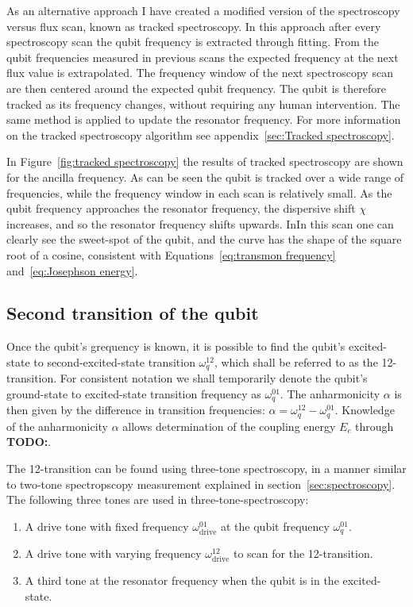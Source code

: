         As an alternative approach I have created a modified version of the spectroscopy versus flux scan, known as tracked spectroscopy. In this approach after every spectroscopy scan the qubit frequency is extracted through fitting. From the qubit frequencies measured in previous scans the expected frequency at the next flux value is extrapolated. The frequency window of the next spectroscopy scan are then centered around the expected qubit frequency. The qubit is therefore tracked as its frequency changes, without requiring any human intervention. The same method is applied to update the resonator frequency. For more information on the tracked spectroscopy algorithm see appendix~\ref{sec:Tracked spectroscopy}.

        In Figure~\ref{fig:tracked spectroscopy} the results of tracked spectroscopy are shown for the ancilla frequency. As can be seen the qubit is tracked over a wide range of frequencies, while the frequency window in each scan is relatively small. As the qubit frequency approaches the resonator frequency, the dispersive shift $\chi$ increases, and so the resonator frequency shifts upwards. InIn this scan one can clearly see the sweet-spot of the qubit, and the curve has the shape of the square root of a cosine, consistent with Equations~\ref{eq:transmon frequency} and~\ref{eq:Josephson energy}.

      \subsection{Second transition of the qubit}
        \label{ssec:12-transition spectroscopy}
        Once the qubit's grequency is known, it is possible to find the qubit's excited-state to second-excited-state transition $\omega_q^{12}$, which shall be referred to as the 12-transition. For consistent notation we shall temporarily denote the qubit's ground-state to excited-state transition frequency as $\omega_q^{01}$. The anharmonicity $\alpha$ is then given by the difference in transition frequencies: $\alpha = \omega_q^{12} - \omega_q^{01}$. Knowledge of the anharmonicity $\alpha$ allows determination of the coupling energy $E_c$ through \textbf{TODO:}.

        The 12-transition can be found using three-tone spectroscopy, in a manner similar to two-tone spectropscopy measurement explained in section~\ref{sec:spectroscopy}. The following three tones are used in three-tone-spectroscopy:

        \begin{enumerate}
          \item A drive tone with fixed frequency $\omega_\text{drive}^{01}$ at the qubit frequency $\omega_q^{01}$.
          \item A drive tone with varying frequency $\omega_\text{drive}^{12}$ to scan for the 12-transition.
          \item A third tone at the resonator frequency when the qubit is in the excited-state.
        \end{enumerate}

